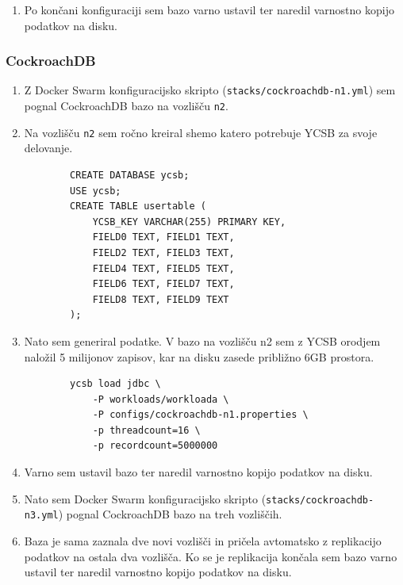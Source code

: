 \documentclass[a4paper, 12pt]{book}
\begin{document}
\begin{enumerate}
    \begin{listing}[H]
    \begin{verbatim}
        \c ycsb;
        SELECT * FROM master_add_node('<n1 ip addr>', 5432);
        SELECT * FROM master_add_node('<n2 ip addr>', 5432);
        SELECT create_distributed_table('usertable', 'ycsb_key');
    \end{verbatim}
    \label{code-ycsb-add-node-citus}
    \end{listing}
    \item Po končani konfiguraciji sem bazo varno ustavil ter naredil varnostno kopijo podatkov na disku.
\end{enumerate}

\subsubsection{CockroachDB}
\begin{enumerate}
    \item Z Docker Swarm konfiguracijsko skripto (\texttt{stacks/cockroachdb-n1.yml}) sem pognal CockroachDB bazo na vozlišču \texttt{n2}.
    \item Na vozlišču \texttt{n2} sem ročno kreiral shemo katero potrebuje YCSB za svoje delovanje.
    \begin{listing}[H]
    \begin{verbatim}
        CREATE DATABASE ycsb;
        USE ycsb;
        CREATE TABLE usertable (
            YCSB_KEY VARCHAR(255) PRIMARY KEY,
            FIELD0 TEXT, FIELD1 TEXT,
            FIELD2 TEXT, FIELD3 TEXT,
            FIELD4 TEXT, FIELD5 TEXT,
            FIELD6 TEXT, FIELD7 TEXT,
            FIELD8 TEXT, FIELD9 TEXT
        );
    \end{verbatim}
    \label{code-ycsb-schema-cockroach}
    \end{listing}
    \item Nato sem generiral podatke. V bazo na vozlišču n2 sem z YCSB orodjem naložil 5 milijonov zapisov, kar na disku zasede približno 6GB prostora.
    \begin{listing}[H]
    \begin{verbatim}
        ycsb load jdbc \
            -P workloads/workloada \
            -P configs/cockroachdb-n1.properties \
            -p threadcount=16 \
            -p recordcount=5000000
    \end{verbatim}
    \label{code-ycsb-load-cockroach}
    \end{listing}
    \item Varno sem ustavil bazo ter naredil varnostno kopijo podatkov na disku.
    \item Nato sem Docker Swarm konfiguracijsko skripto (\texttt{stacks/cockroachdb-n3.yml}) pognal CockroachDB bazo na treh vozliščih.
    \item Baza je sama zaznala dve novi vozlišči in pričela avtomatsko z replikacijo podatkov na ostala dva vozlišča. Ko se je replikacija končala sem bazo varno ustavil ter naredil varnostno kopijo podatkov na disku.
\end{enumerate}
\end{document}

